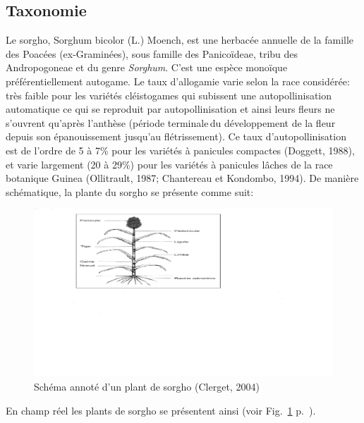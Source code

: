 \documentclass[a4paper,11pt]{article}
\begin{document}
\subsection{Taxonomie}
Le sorgho, Sorghum bicolor (L.) Moench, est une herbacée annuelle de
la famille des Poacées (ex-Graminées), sous famille des Panicoïdeae,
tribu des Andropogoneae et du genre \emph{Sorghum}\cite{Doggett_1988}.
C’est une espèce monoïque préférentiellement
autogame. Le taux d’allogamie varie selon la race considérée: très
faible pour les variétés cléistogames qui subissent une
autopollinisation automatique ce qui se reproduit par autopollinisation et ainsi
leurs fleurs ne s’ouvrent qu’après l’anthèse (période terminale\,du
développement de la fleur depuis son épanouissement jusqu’au
flétrissement). Ce taux d'autopollinisation est de l’ordre de 5 à 7\% pour les variétés à
panicules compactes (Doggett, 1988), et varie largement (20 à 29\%)
pour les variétés à panicules lâches de la race botanique Guinea
(Ollitrault, 1987; Chantereau et Kondombo, 1994). De manière
schématique, la plante du sorgho se présente comme suit:



 \begin{figure}%
  \begin{center}
    \includegraphics[width=18cm]{images/Schema_Plant_Sorgho}
  \end{center}
  \caption{Schéma annoté d’un plant de sorgho (Clerget, 2004)}
  \label{fig-Schema_plant_sorgho}
  \end{figure}


En champ réel les plants de sorgho se présentent ainsi (voir
Fig.~\ref{fig-Schema_plant_sorgho}
p.~\pageref{fig-Schema_plant_sorgho}).
\end{document}
